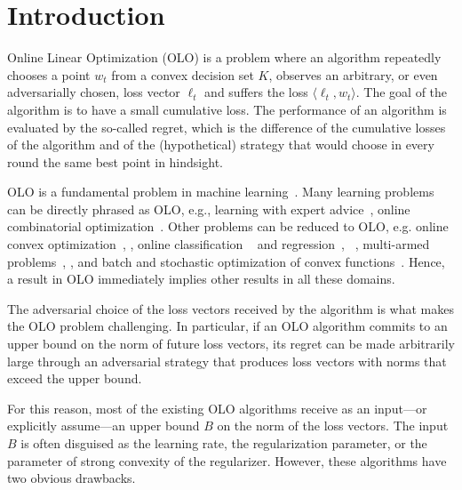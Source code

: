 \section{Introduction}
\label{section:introduction}

Online Linear Optimization (OLO) is a problem where an algorithm repeatedly
chooses a point $w_t$ from a convex decision set $K$, observes an arbitrary, or
even adversarially chosen, loss vector $\ell_t$ and suffers the loss $\langle
\ell_t, w_t \rangle$.  The goal of the algorithm is to have a small cumulative
loss. The performance of an algorithm is evaluated by the so-called regret,
which is the difference of the cumulative losses of the algorithm and of the
(hypothetical) strategy that would choose in every round the same best point in
hindsight.

OLO is a fundamental problem in machine
learning~\cite{Cesa-Bianchi-Lugosi-2006, Rakhlin-Sridharan-2009,
Shalev-Shwartz-2011}.  Many learning problems can be directly phrased as OLO,
e.g., learning with expert advice~\cite{Littlestone-Warmuth-1994, Vovk-1998,
Freund-Schapire-1997, Cesa-Bianchi-Haussler-Helmbold-Schapire-Warmuth-1997},
online combinatorial optimization~\cite{Kalai-Vempala-2005,
Helmbold-Warmuth-2009, Koolen-Warmuth-Kivinen-2010}. Other problems can be
reduced to OLO, e.g. online convex
optimization~\cite{Abernethy-Bartlett-Rakhlin-Tewari-2008},
\cite[Chapter~2]{Shalev-Shwartz-2011}, online classification
~\cite{Rosenblatt-1958, Freund-Schapire-1999} and
regression~\cite{Kivinen-Warmuth-1997},
~\cite[Chapters~11~and~12]{Cesa-Bianchi-Lugosi-2006}, multi-armed
problems~\cite[Chapter~6]{Cesa-Bianchi-Lugosi-2006},
\cite{Abernethy-Hazan-Rakhlin-2008, Bubeck-Cesa-Bianchi-2012}, and batch and
stochastic optimization of convex functions~\cite{Nemirovski-Yudin-1983,
Bubeck-2015}.  Hence, a result in OLO immediately implies other results in all
these domains.

The adversarial choice of the loss vectors received by the algorithm is what
makes the OLO problem challenging. In particular, if an OLO algorithm commits
to an upper bound on the norm of future loss vectors, its regret can be made
arbitrarily large through an adversarial strategy that produces loss vectors
with norms that exceed the upper bound.

For this reason, most of the existing OLO algorithms receive as an input---or
explicitly assume---an upper bound $B$ on the norm of the loss vectors.  The
input $B$ is often disguised as the learning rate, the regularization
parameter, or the parameter of strong convexity of the regularizer.
However, these algorithms have two obvious drawbacks.

